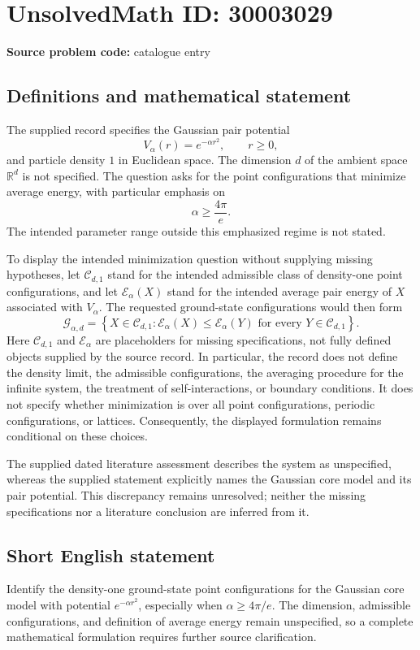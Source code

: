 \documentclass[11pt]{article}
\newcommand{\R}{\mathbb{R}}
\begin{document}
\section*{UnsolvedMath ID: 30003029}
\textbf{Source problem code:} catalogue entry
\subsection{Definitions and mathematical statement}
The supplied record specifies the Gaussian pair potential
\[
V_{\alpha}(r)=e^{-\alpha r^{2}},\qquad r\geq 0,
\]
and particle density \(1\) in Euclidean space. The dimension \(d\) of the ambient space \(\R^{d}\) is not specified. The question asks for the point configurations that minimize average energy, with particular emphasis on
\[
\alpha\geq \frac{4\pi}{e}.
\]
The intended parameter range outside this emphasized regime is not stated.

To display the intended minimization question without supplying missing hypotheses, let \(\mathcal C_{d,1}\) stand for the intended admissible class of density-one point configurations, and let \(\mathcal E_{\alpha}(X)\) stand for the intended average pair energy of \(X\) associated with \(V_{\alpha}\). The requested ground-state configurations would then form
\[
\mathcal G_{\alpha,d}
=
\left\{X\in\mathcal C_{d,1}:
\mathcal E_{\alpha}(X)\leq\mathcal E_{\alpha}(Y)
\text{ for every }Y\in\mathcal C_{d,1}\right\}.
\]
Here \(\mathcal C_{d,1}\) and \(\mathcal E_{\alpha}\) are placeholders for missing specifications, not fully defined objects supplied by the source record. In particular, the record does not define the density limit, the admissible configurations, the averaging procedure for the infinite system, the treatment of self-interactions, or boundary conditions. It does not specify whether minimization is over all point configurations, periodic configurations, or lattices. Consequently, the displayed formulation remains conditional on these choices.

The supplied dated literature assessment describes the system as unspecified, whereas the supplied statement explicitly names the Gaussian core model and its pair potential. This discrepancy remains unresolved; neither the missing specifications nor a literature conclusion are inferred from it.
\subsection{Short English statement}
Identify the density-one ground-state point configurations for the Gaussian core model with potential \(e^{-\alpha r^{2}}\), especially when \(\alpha\geq 4\pi/e\). The dimension, admissible configurations, and definition of average energy remain unspecified, so a complete mathematical formulation requires further source clarification.
\end{document}
